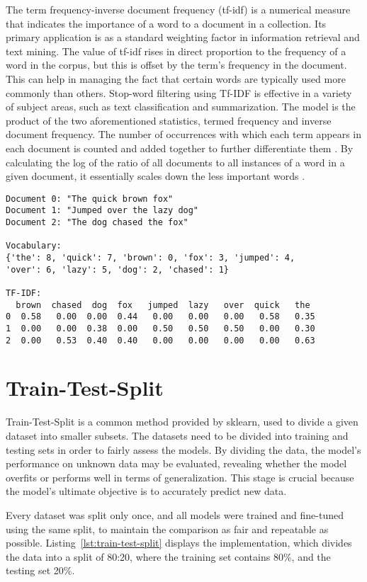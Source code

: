 The term frequency-inverse document frequency (tf-idf) is a numerical measure that indicates the importance of a word to a document in a collection. Its primary application is as a standard weighting factor in information retrieval and text mining. The value of tf-idf rises in direct proportion to the frequency of a word in the corpus, but this is offset by the term's frequency in the document. This can help in managing the fact that certain words are typically used more commonly than others. Stop-word filtering using Tf-IDF is effective in a variety of subject areas, such as text classification and summarization. The model is the product of the two aforementioned statistics, termed frequency and inverse document frequency. The number of occurrences with which each term appears in each document is counted and added together to further differentiate them \citep{vijayarani_preprocessing_2015}. By calculating the log of the ratio of all documents to all instances of a word in a given document, it essentially scales down the less important words \citep{tabassum_survey_2020}.

\begin{verbatim}
Document 0: "The quick brown fox"
Document 1: "Jumped over the lazy dog"
Document 2: "The dog chased the fox"

Vocabulary: 
{'the': 8, 'quick': 7, 'brown': 0, 'fox': 3, 'jumped': 4,
'over': 6, 'lazy': 5, 'dog': 2, 'chased': 1}

TF-IDF:
  brown  chased  dog  fox   jumped  lazy   over  quick   the 
0  0.58   0.00  0.00  0.44   0.00   0.00   0.00   0.58   0.35  
1  0.00   0.00  0.38  0.00   0.50   0.50   0.50   0.00   0.30  
2  0.00   0.53  0.40  0.40   0.00   0.00   0.00   0.00   0.63   
\end{verbatim}

\section{Train-Test-Split}

Train-Test-Split is a common method provided by sklearn, used to divide a given dataset into smaller subsets. The datasets need to be divided into training and testing sets in order to fairly assess the models. By dividing the data, the model's performance on unknown data may be evaluated, revealing whether the model overfits or performs well in terms of generalization. This stage is crucial because the model's ultimate objective is to accurately predict new data.

Every dataset was split only once, and all models were trained and fine-tuned using the same split, to maintain the comparison as fair and repeatable as possible. Listing~\ref{lst:train-test-split} displays the implementation, which divides the data into a split of 80:20, where the training set contains 80\%, and the testing set 20\%. 

